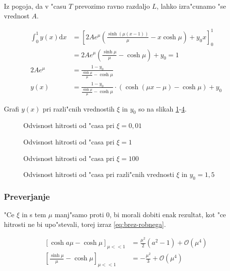 \documentclass[12pt]{article}
\newcommand{\dd}{\mathrm{d}}
\begin{document}
Iz pogoja, da v "casu $T$ prevozimo ravno razdaljo $L$, lahko izra"cunamo "se vrednost $A$. 

\begin{align}
  \int_0^1 y(x)\dd x &= \left[2Ae^\mu \left( \frac{\sinh(\mu(x-1))}{\mu}  - x\cosh \mu\right) + y_0x\right]_{0}^{1} \\
  &= 2Ae^\mu \left( \frac{\sinh \mu}{\mu} - \cosh \mu \right) + y_0 = 1 \\
2Ae^{\mu} &= \frac{1-y_0}{\frac{\sinh\mu}{\mu} - \cosh \mu } \\
y(x) &= \frac{1-y_0}{\frac{\sinh\mu}{\mu} - \cosh \mu } \cdot \left( \cosh(\mu x - \mu) - \cosh \mu \right) + y_0 \label{eq:hitrost-koncni}
\end{align}

Grafi $y(x)$ pri razli"cnih vrednostih $\xi$ in $y_0$ so na slikah \ref{fig:hitrosti-1}-\ref{fig:hitrosti-mu}. 

\begin{figure}

\caption{Odvisnost hitrosti od "casa pri $\xi = 0,01$}
\label{fig:hitrosti-1}
\end{figure}

\begin{figure}

\caption{Odvisnost hitrosti od "casa pri $\xi = 1$}
\label{fig:hitrosti-2}
\end{figure}

\begin{figure}

\caption{Odvisnost hitrosti od "casa pri $\xi = 100$}
\label{fig:hitrosti-3}
\end{figure}

\begin{figure}

\caption{Odvisnost hitrosti od "casa pri razli"cnih vrednosti $\xi$ in $y_0 = 1,5$}
\label{fig:hitrosti-mu}
\end{figure}

\subsubsection{Preverjanje}

"Ce $\xi$ in s tem $\mu$ manj"samo proti $0$, bi morali dobiti enak rezultat, kot "ce hitrosti ne bi upo"stevali, torej izraz \ref{eq:brez-robnega}. 

\begin{align}
  \left[\cosh a\mu - \cosh \mu \right]_{\mu << 1} &= \frac{\mu^2}{2} (a^2-1) + \mathcal{O} (\mu^4) \\
  \left[\frac{\sinh\mu}{\mu} - \cosh \mu \right]_{\mu << 1} &= -\frac{\mu^2}{3} + \mathcal{O} (\mu^4)
\end{align}
\end{document}
